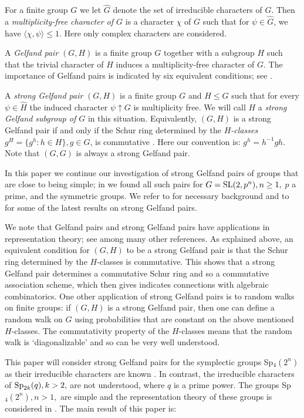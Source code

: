 \documentclass{amsart}
\begin{document}
For a finite group $G$ we let $\hat G$ denote the set of irreducible characters of $G$. Then  a {\it multiplicity-free character of $G$} is a character $\chi$ of $G$ such that for   $\psi\in \hat G$, we have $\langle \chi, \psi \rangle \leq 1$. Here only complex characters are considered.
 
A {\it Gelfand pair} $(G,H)$ is a finite group $G$ together with a subgroup $H$ such that the trivial character of $H$ induces a multiplicity-free character of
$G$. The importance of Gelfand pairs is indicated by six equivalent conditions; see     \cite{AHN, BH, Har, Wik}.


A {\it strong Gelfand pair} $(G,H)$ is a finite group $G$ and   $H\le G$ such that for every   $\psi \in \hat H$  the induced character $\psi\uparrow G$ is multiplicity free. 
We will call $H$ a {\it strong Gelfand subgroup of $G$} in this situation. 
Equivalently, $(G,H)$ is a strong Gelfand pair if and only if the Schur ring determined by the {\it $H$-classes} $g^H = \{ g^h : h \in H\}, g\in G$, is commutative \cite{Har, JKar, Den}. Here  our convention is: $g^h=h^{-1}gh$. Note that $(G,G)$ is always a strong Gelfand pair.

In this paper we continue our investigation of strong Gelfand pairs of  groups that are close to being simple; in \cite {AHN, BH, GH}  we found all such pairs for 
 $G={\rm SL}(2,p^n),n\ge 1,$  $p$ a prime, and  the  symmetric groups. We refer to \cite {BH,Har, GH} for necessary background and to \cite {BC} for some of  the latest results on strong Gelfand pairs.
 

 We note that Gelfand pairs and strong Gelfand pairs have applications in representation theory; see  \cite {A,AA,BC,C} among many other references.
As explained above, an equivalent condition for  $(G,H)$ to be  a strong Gelfand pair is that the Schur ring determined by the $H$-classes is commutative.
This shows that a strong Gelfand pair determines a commutative Schur ring and so a commutative  association scheme, which then gives  indicates connections with algebraic combinatorics.
One other application of strong Gelfand pairs is to random walks on finite groups: if $(G,H)$ is  a strong Gelfand pair, then one can define a random walk on $G$ using probabilities that are constant on the above mentioned $H$-classes. The commutativity property of the $H$-classes means that the random walk is `diagonalizable' and so can be very well 
understood.


This paper will consider strong Gelfand pairs for the symplectic groups {\rm Sp}$_4(2^n)$ as their irreducible characters are known \cite{speven}. In contrast, the irreducible characters of ${\rm Sp}_{2k}(q),k>2,$ are not understood, where $q$ is a prime power. The  groups {\rm Sp}$_4(2^n), n>1,$ are simple and  the representation theory of these groups is considered in \cite {Da}.
 The main result of this paper is: 
\end{document}
